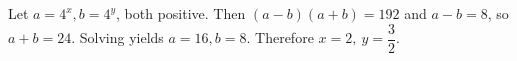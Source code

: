 Let $ a=4^x,b=4^y $, both positive. Then $(a-b)(a+b)=192 $ and $ a-b=8 $, so $ a+b=24 $. Solving yields $ a=16,b=8 $. Therefore $\boxed{x=2,\ y=\dfrac{3}{2}}$.
